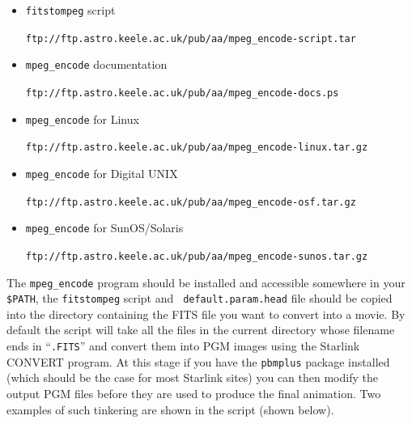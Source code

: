 \documentclass[twoside,11pt]{article}
\newcommand{\htmladdnormallink}[2]{#1}
\newcommand{\htmlref}[2]{#1}
\begin{document}
\begin{itemize}
\item {{\tt fitstompeg} script}\\
\begin{small}\htmladdnormallink{{\tt ftp://ftp.astro.keele.ac.uk/pub/aa/mpeg\_encode-script.tar}}{ftp://ftp.astro.keele.ac.uk/pub/aa/mpeg_encode-script.tar}\end{small}
\item {{\tt mpeg\_encode} documentation}\\
\begin{small}\htmladdnormallink{{\tt ftp://ftp.astro.keele.ac.uk/pub/aa/mpeg\_encode-docs.ps}}{ftp://ftp.astro.keele.ac.uk/pub/aa/mpeg_encode-docs.ps}\end{small}
\item {{\tt mpeg\_encode} for Linux}\\
\begin{small}\htmladdnormallink{{\tt ftp://ftp.astro.keele.ac.uk/pub/aa/mpeg\_encode-linux.tar.gz}}{ftp://ftp.astro.keele.ac.uk/pub/aa/mpeg_encode-linux.tar.gz}\end{small}
\item {{\tt mpeg\_encode} for Digital UNIX}\\
\begin{small}\htmladdnormallink{{\tt ftp://ftp.astro.keele.ac.uk/pub/aa/mpeg\_encode-osf.tar.gz}}{ftp://ftp.astro.keele.ac.uk/pub/aa/mpeg_encode-osf.tar.gz}\end{small}
\item {{\tt mpeg\_encode} for SunOS/Solaris}\\
\begin{small}\htmladdnormallink{{\tt ftp://ftp.astro.keele.ac.uk/pub/aa/mpeg\_encode-sunos.tar.gz}}{ftp://ftp.astro.keele.ac.uk/pub/aa/mpeg_encode-sunos.tar.gz}\end{small}
\end{itemize}

The {\tt mpeg\_encode} program should be installed and accessible
somewhere in your {\tt \$PATH}, the {\tt fitstompeg} script and {\tt
default.param.head} file should be copied into the directory
containing the FITS file you want to convert into a movie. By default
the script will take all the files in the current directory whose
filename ends in ``{\tt .FITS}'' and convert them into PGM images
using the Starlink CONVERT program. At this stage if you have the
\htmlref{{\tt pbmplus}}{sc15_pbmplus} package installed (which should
be the case for most Starlink sites) you can then modify the output
PGM files before they are used to produce the final animation. Two
examples of such tinkering are shown in the script (shown below).
\end{document}
